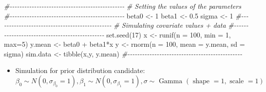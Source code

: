 \documentclass[
]{article}
\newenvironment{Shaded}{\begin{snugshade}}{\end{snugshade}}
\newcommand{\AttributeTok}[1]{\textcolor[rgb]{0.77,0.63,0.00}{#1}}
\newcommand{\CommentTok}[1]{\textcolor[rgb]{0.56,0.35,0.01}{\textit{#1}}}
\newcommand{\DecValTok}[1]{\textcolor[rgb]{0.00,0.00,0.81}{#1}}
\newcommand{\FloatTok}[1]{\textcolor[rgb]{0.00,0.00,0.81}{#1}}
\newcommand{\FunctionTok}[1]{\textcolor[rgb]{0.00,0.00,0.00}{#1}}
\newcommand{\NormalTok}[1]{#1}
\newcommand{\OtherTok}[1]{\textcolor[rgb]{0.56,0.35,0.01}{#1}}
\newcommand{\SpecialCharTok}[1]{\textcolor[rgb]{0.00,0.00,0.00}{#1}}
\providecommand{\tightlist}{%
  \setlength{\itemsep}{0pt}\setlength{\parskip}{0pt}}
\begin{document}
\begin{Shaded}
\begin{Highlighting}[]
\CommentTok{\#{-}{-}{-}{-}{-}{-}{-}{-}{-}{-}{-}{-}{-}{-}{-}{-}{-}{-}{-}{-}{-}{-}{-}{-}{-}{-}{-}{-}{-}{-}{-}{-}{-}{-}{-}{-}{-}{-}{-}{-}{-}{-}{-}{-}{-}{-}{-}}
\CommentTok{\# Setting the values of the parameters}
\CommentTok{\#{-}{-}{-}{-}{-}{-}{-}{-}{-}{-}{-}{-}{-}{-}{-}{-}{-}{-}{-}{-}{-}{-}{-}{-}{-}{-}{-}{-}{-}{-}{-}{-}{-}{-}{-}{-}{-}{-}{-}{-}{-}{-}{-}{-}{-}{-}{-}}
\NormalTok{beta0 }\OtherTok{\textless{}{-}} \DecValTok{1}
\NormalTok{beta1 }\OtherTok{\textless{}{-}} \FloatTok{0.5}
\NormalTok{sigma }\OtherTok{\textless{}{-}} \DecValTok{1}
\CommentTok{\#{-}{-}{-}{-}{-}{-}{-}{-}{-}{-}{-}{-}{-}{-}{-}{-}{-}{-}{-}{-}{-}{-}{-}{-}{-}{-}{-}{-}{-}{-}{-}{-}{-}{-}{-}{-}{-}{-}{-}{-}{-}{-}{-}{-}{-}{-}{-}}
\CommentTok{\# Simulating covariate values + data}
\CommentTok{\#{-}{-}{-}{-}{-}{-}{-}{-}{-}{-}{-}{-}{-}{-}{-}{-}{-}{-}{-}{-}{-}{-}{-}{-}{-}{-}{-}{-}{-}{-}{-}{-}{-}{-}{-}{-}{-}{-}{-}{-}{-}{-}{-}{-}{-}{-}{-}}
\FunctionTok{set.seed}\NormalTok{(}\DecValTok{17}\NormalTok{)}
\NormalTok{x }\OtherTok{\textless{}{-}} \FunctionTok{runif}\NormalTok{(}\AttributeTok{n =} \DecValTok{100}\NormalTok{, }\AttributeTok{min =} \DecValTok{1}\NormalTok{, }\AttributeTok{max=}\DecValTok{5}\NormalTok{)}
\NormalTok{y.mean }\OtherTok{\textless{}{-}}\NormalTok{ beta0 }\SpecialCharTok{+}\NormalTok{ beta1}\SpecialCharTok{*}\NormalTok{x}
\NormalTok{y }\OtherTok{\textless{}{-}} \FunctionTok{rnorm}\NormalTok{(}\AttributeTok{n =} \DecValTok{100}\NormalTok{, }
           \AttributeTok{mean =}\NormalTok{ y.mean, }
           \AttributeTok{sd =}\NormalTok{ sigma)}
\NormalTok{sim.data }\OtherTok{\textless{}{-}} \FunctionTok{tibble}\NormalTok{(x,y, y.mean)}
\CommentTok{\#{-}{-}{-}{-}{-}{-}{-}{-}{-}{-}{-}{-}{-}{-}{-}{-}{-}{-}{-}{-}{-}{-}{-}{-}{-}{-}{-}{-}{-}{-}{-}{-}{-}{-}{-}{-}{-}{-}{-}{-}{-}{-}{-}{-}{-}{-}{-}}
\end{Highlighting}
\end{Shaded}

\begin{itemize}
\tightlist
\item
  Simulation for prior distribution candidate: \[\begin{equation}
  \beta_0 \sim N\left(0, \sigma_{\beta_0}=1\right), \beta_1 \sim N\left(0, \sigma_{\beta_1}=1\right), \sigma \sim \text { Gamma }(\text { shape }=1, \text { scale }=1)
  \end{equation}\]
\end{itemize}
\end{document}

